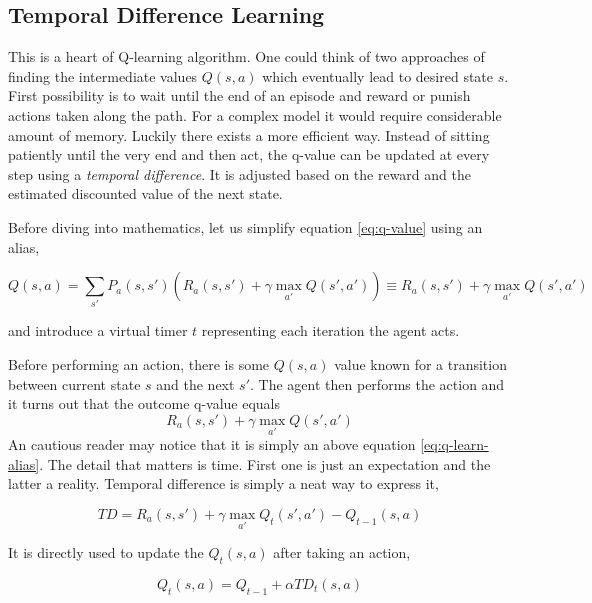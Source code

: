 \subsection{Temporal Difference Learning}
\label{sub:temporal-difference-learning}

This is a heart of Q-learning algorithm. One could think of two approaches of finding the intermediate values $Q(s, a)$ which eventually lead to desired state $s$. First possibility is to wait until the end of an episode and reward or punish actions taken along the path. For a complex model it would require considerable amount of memory. Luckily there exists a more efficient way. Instead of sitting patiently until the very end and then act, the q-value can be updated at every step using a \emph{temporal difference}. It is adjusted based on the reward and the estimated discounted value of the next state.

Before diving into mathematics, let us simplify equation \ref{eq:q-value} using an alias,

\begin{equation}
    Q(s, a) = \sum_{s'} P_a(s, s') \left(R_a(s, s') + \gamma \max_{a'} Q(s', a') \right)
    \equiv
    R_a(s, s') + \gamma \max_{a'} Q(s', a')
\label{eq:q-learn-alias}
\end{equation}

and introduce a virtual timer $t$ representing each iteration the agent acts.

Before performing an action, there is some $Q(s, a)$ value known for a transition between current state $s$ and the next $s'$. The agent then performs the action and it turns out that the outcome q-value equals \[R_a(s, s') + \gamma \max_{a'} Q(s', a')\]
An cautious reader may notice that it is simply an above equation \ref{eq:q-learn-alias}. The detail that matters is time. First one is just an expectation and the latter a reality. Temporal difference is simply a neat way to express it,

\begin{equation}
    TD = R_a(s, s') + \gamma \max_{a'} Q_{t}(s', a') - Q_{t-1}(s, a)
\label{eq:temporal-difference}
\end{equation}

It is directly used to update the $Q_t(s, a)$ after taking an action,

\begin{equation}
    Q_t(s, a) = Q_{t-1} + \alpha TD_t(s, a)
\end{equation}

